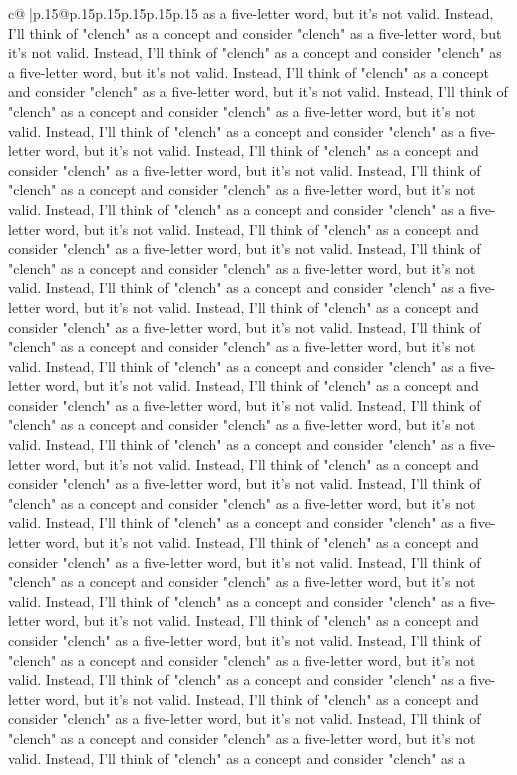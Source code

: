 \documentclass{article}
\begin{document}
{\begin{supertabular}{c@{$\;$}|p{.15\linewidth}@{}p{.15\linewidth}p{.15\linewidth}p{.15\linewidth}p{.15\linewidth}p{.15\linewidth}}
{{{as a five-letter word, but it's not valid. Instead, I'll think of "clench" as a concept and consider "clench" as a five-letter word, but it's not valid. Instead, I'll think of "clench" as a concept and consider "clench" as a five-letter word, but it's not valid. Instead, I'll think of "clench" as a concept and consider "clench" as a five-letter word, but it's not valid. Instead, I'll think of "clench" as a concept and consider "clench" as a five-letter word, but it's not valid. Instead, I'll think of "clench" as a concept and consider "clench" as a five-letter word, but it's not valid. Instead, I'll think of "clench" as a concept and consider "clench" as a five-letter word, but it's not valid. Instead, I'll think of "clench" as a concept and consider "clench" as a five-letter word, but it's not valid. Instead, I'll think of "clench" as a concept and consider "clench" as a five-letter word, but it's not valid. Instead, I'll think of "clench" as a concept and consider "clench" as a five-letter word, but it's not valid. Instead, I'll think of "clench" as a concept and consider "clench" as a five-letter word, but it's not valid. Instead, I'll think of "clench" as a concept and consider "clench" as a five-letter word, but it's not valid. Instead, I'll think of "clench" as a concept and consider "clench" as a five-letter word, but it's not valid. Instead, I'll think of "clench" as a concept and consider "clench" as a five-letter word, but it's not valid. Instead, I'll think of "clench" as a concept and consider "clench" as a five-letter word, but it's not valid. Instead, I'll think of "clench" as a concept and consider "clench" as a five-letter word, but it's not valid. Instead, I'll think of "clench" as a concept and consider "clench" as a five-letter word, but it's not valid. Instead, I'll think of "clench" as a concept and consider "clench" as a five-letter word, but it's not valid. Instead, I'll think of "clench" as a concept and consider "clench" as a five-letter word, but it's not valid. Instead, I'll think of "clench" as a concept and consider "clench" as a five-letter word, but it's not valid. Instead, I'll think of "clench" as a concept and consider "clench" as a five-letter word, but it's not valid. Instead, I'll think of "clench" as a concept and consider "clench" as a five-letter word, but it's not valid. Instead, I'll think of "clench" as a concept and consider "clench" as a five-letter word, but it's not valid. Instead, I'll think of "clench" as a concept and consider "clench" as a five-letter word, but it's not valid. Instead, I'll think of "clench" as a concept and consider "clench" as a five-letter word, but it's not valid. Instead, I'll think of "clench" as a concept and consider "clench" as a five-letter word, but it's not valid. Instead, I'll think of "clench" as a concept and consider "clench" as a five-letter word, but it's not valid. Instead, I'll think of "clench" as a concept and consider "clench" as a five-letter word, but it's not valid. Instead, I'll think of "clench" as a concept and consider "clench" as a five-letter word, but it's not valid. Instead, I'll think of "clench" as a concept and consider "clench" as a }}}
\end{supertabular}}
\end{document}
